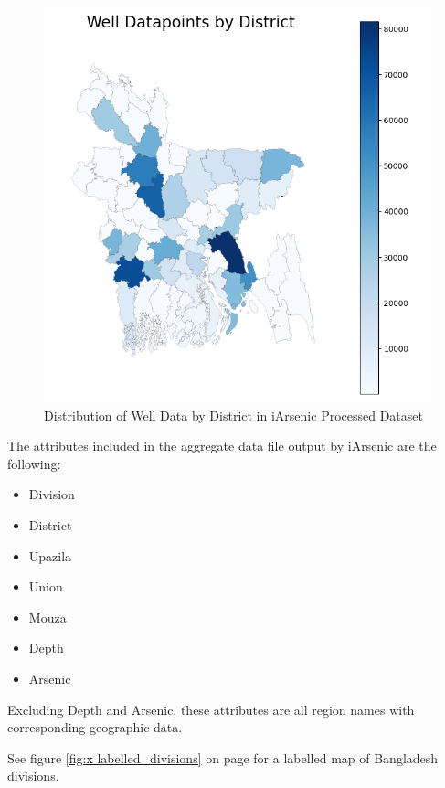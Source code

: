\begin{figure}[!htb]
    \centering
    \includegraphics[scale=0.6]{figures/data_distribution_by_district.png} 
    \caption{Distribution of Well Data by District in iArsenic Processed Dataset}
    \label{fig:x avg_datapoints}
\end{figure}

The attributes included in the aggregate data file output by iArsenic are the following:

\begin{itemize}
    \item Division
    \item District
    \item Upazila
    \item Union
    \item Mouza
    \item Depth
    \item Arsenic
\end{itemize}

Excluding Depth and Arsenic, these attributes are all region names with corresponding geographic data. 

See figure \ref{fig:x labelled_divisions} on page \pageref{fig:x labelled_divisions} for a labelled map of Bangladesh divisions.

